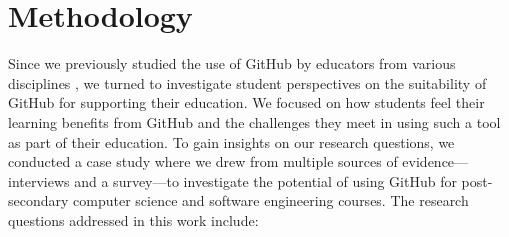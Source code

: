 \section{Methodology}
Since we previously studied the use of GitHub by educators from various disciplines \cite{zagalsky2015emergence}, we turned to investigate student perspectives on the suitability of GitHub for supporting their education. We focused on how students feel their learning benefits from GitHub and the challenges they meet in using such a tool as part of their education. To gain insights on our research questions, we conducted a case study \cite{yin2013case,runeson2012case} where we drew from multiple sources of evidence---interviews and a survey---to investigate the potential of using GitHub for post-secondary computer science and software engineering courses. The research questions addressed in this work include:

%

